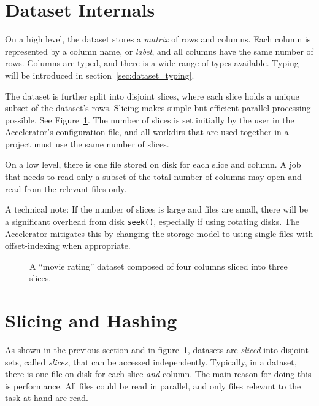 \section{Dataset Internals}

On a high level, the dataset stores a \textsl{matrix} of rows and
columns.  Each column is represented by a column name,
or \emph{label}, and all columns have the same number of rows.
Columns are typed, and there is a wide range of types available.
Typing will be introduced in section~\ref{sec:dataset_typing}.

The dataset is further split into disjoint slices, where each slice
holds a unique subset of the dataset's rows.  Slicing makes simple but
efficient parallel processing possible.  See Figure~\ref{fig:slices}.
The number of slices is set initially by the user in the Accelerator's
configuration file, and all workdirs that are used together in a
project must use the same number of slices.

On a low level, there is one file stored on disk for each slice and
column.  A job that needs to read only a subset of the total number of
columns may open and read from the relevant files only.

A technical note: If the number of slices is large and files are
small, there will be a significant overhead from disk \texttt{seek()},
especially if using rotating disks.  The Accelerator mitigates this by
changing the storage model to using single files with offset-indexing
when appropriate.

\begin{figure}[b!]
  \begin{center}
     
     \caption{A ``movie rating'' dataset composed of four columns
              sliced into three slices.}
     \label{fig:slices}
  \end{center}
\end{figure}


\section{Slicing and Hashing}
\label{sec:slicing_and_hashing}

As shown in the previous section and in figure~\ref{fig:slices},
datasets are \textsl{sliced} into disjoint sets,
called \textsl{slices}, that can be accessed independently.
Typically, in a dataset, there is one file on disk for each slice
\textsl{and} column.  The main reason for doing this is performance.
All files could be read in parallel, and only files relevant to the
task at hand are read.


